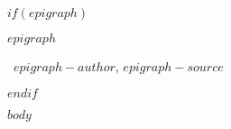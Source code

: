 \documentclass[letterpaper,twoside,openright]{tufte-book}
\newcommand{\openepigraph}[3]{ %
{\noindent\rmfamily\normalsize
{\itshape{#1}}
\begin{flushright}\noindent\aldine ~{#2}, {\itshape{#3}} \end{flushright}}
}
\begin{document}
\cleardoublepage

$if(epigraph)$
\vspace*{\fill}
\openepigraph{$epigraph$}{$epigraph-author$}{$epigraph-source$}
\vspace*{\fill}
$endif$


\mainmatter

$body$

\clearpage
\end{document}
